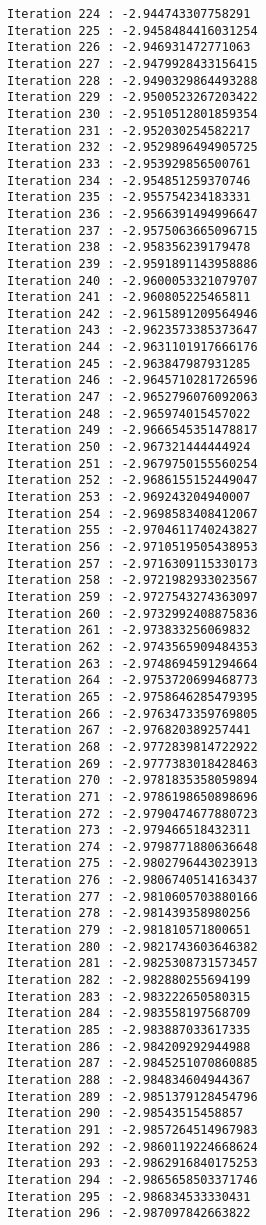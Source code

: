 \documentclass[11pt]{article}
\begin{document}
\begin{Verbatim}[commandchars=\\\{\}]
Iteration 224 : -2.944743307758291
Iteration 225 : -2.9458484416031254
Iteration 226 : -2.946931472771063
Iteration 227 : -2.9479928433156415
Iteration 228 : -2.9490329864493288
Iteration 229 : -2.9500523267203422
Iteration 230 : -2.9510512801859354
Iteration 231 : -2.952030254582217
Iteration 232 : -2.9529896494905725
Iteration 233 : -2.953929856500761
Iteration 234 : -2.954851259370746
Iteration 235 : -2.955754234183331
Iteration 236 : -2.9566391494996647
Iteration 237 : -2.9575063665096715
Iteration 238 : -2.958356239179478
Iteration 239 : -2.9591891143958886
Iteration 240 : -2.9600053321079707
Iteration 241 : -2.960805225465811
Iteration 242 : -2.9615891209564946
Iteration 243 : -2.9623573385373647
Iteration 244 : -2.9631101917666176
Iteration 245 : -2.963847987931285
Iteration 246 : -2.9645710281726596
Iteration 247 : -2.9652796076092063
Iteration 248 : -2.965974015457022
Iteration 249 : -2.9666545351478817
Iteration 250 : -2.967321444444924
Iteration 251 : -2.9679750155560254
Iteration 252 : -2.9686155152449047
Iteration 253 : -2.969243204940007
Iteration 254 : -2.9698583408412067
Iteration 255 : -2.9704611740243827
Iteration 256 : -2.9710519505438953
Iteration 257 : -2.9716309115330173
Iteration 258 : -2.9721982933023567
Iteration 259 : -2.9727543274363097
Iteration 260 : -2.9732992408875836
Iteration 261 : -2.973833256069832
Iteration 262 : -2.9743565909484353
Iteration 263 : -2.9748694591294664
Iteration 264 : -2.9753720699468773
Iteration 265 : -2.9758646285479395
Iteration 266 : -2.9763473359769805
Iteration 267 : -2.976820389257441
Iteration 268 : -2.9772839814722922
Iteration 269 : -2.9777383018428463
Iteration 270 : -2.9781835358059894
Iteration 271 : -2.9786198650898696
Iteration 272 : -2.9790474677880723
Iteration 273 : -2.979466518432311
Iteration 274 : -2.9798771880636648
Iteration 275 : -2.9802796443023913
Iteration 276 : -2.9806740514163437
Iteration 277 : -2.9810605703880166
Iteration 278 : -2.981439358980256
Iteration 279 : -2.981810571800651
Iteration 280 : -2.9821743603646382
Iteration 281 : -2.9825308731573457
Iteration 282 : -2.982880255694199
Iteration 283 : -2.983222650580315
Iteration 284 : -2.983558197568709
Iteration 285 : -2.983887033617335
Iteration 286 : -2.984209292944988
Iteration 287 : -2.9845251070860885
Iteration 288 : -2.984834604944367
Iteration 289 : -2.9851379128454796
Iteration 290 : -2.98543515458857
Iteration 291 : -2.9857264514967983
Iteration 292 : -2.9860119224668624
Iteration 293 : -2.9862916840175253
Iteration 294 : -2.9865658503371746
Iteration 295 : -2.986834533330431
Iteration 296 : -2.987097842663822

\end{Verbatim}
\end{document}
